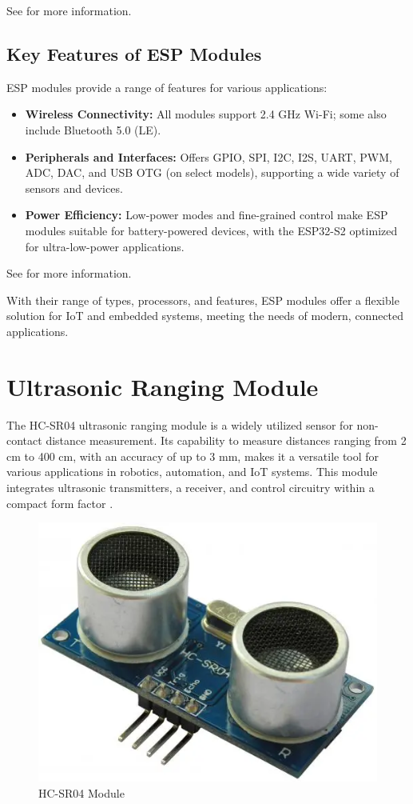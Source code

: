 See \cite{EspressifModules} for more information.

\subsection{Key Features of ESP Modules}

ESP modules provide a range of features for various applications:

\begin{itemize}
	\item \textbf{Wireless Connectivity:} All modules support 2.4 GHz Wi-Fi; some also include Bluetooth 5.0 (LE).
	
	\item \textbf{Peripherals and Interfaces:} Offers GPIO, SPI, I2C, I2S, UART, PWM, ADC, DAC, and USB OTG (on select models), supporting a wide variety of sensors and devices.
	
	\item \textbf{Power Efficiency:} Low-power modes and fine-grained control make ESP modules suitable for battery-powered devices, with the ESP32-S2 optimized for ultra-low-power applications.
\end{itemize}

See \cite{EspressifModules} for more information.

With their range of types, processors, and features, ESP modules offer a flexible solution for IoT and embedded systems, meeting the needs of modern, connected applications.

\section{Ultrasonic Ranging Module}

The HC-SR04 ultrasonic ranging module is a widely utilized sensor for non-contact distance measurement. Its capability to measure distances ranging from 2 cm to 400 cm, with an accuracy of up to 3 mm, makes it a versatile tool for various applications in robotics, automation, and IoT systems. This module integrates ultrasonic transmitters, a receiver, and control circuitry within a compact form factor \cite{HCSR04Datasheet}.

\begin{figure}
	\centering
	\includegraphics[width=0.4\linewidth]{assets/ch2/ultrasonic}
	\caption{HC-SR04 Module}
	\label{fig:ultrasonic}
\end{figure}


